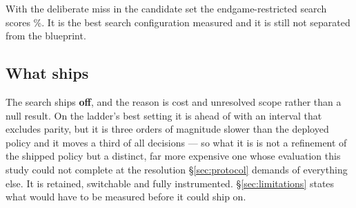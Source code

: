 With the deliberate miss in the candidate set the endgame-restricted search scores
\vsixSearchDead\%. It is the best search configuration measured and it is still not separated from
the blueprint.

\subsection{What ships}
\label{sec:search-ships}

The search ships \textbf{off}, and the reason is cost and unresolved scope rather than a null
result. On the ladder's best setting it is ahead of \vfive{} with an interval that excludes parity,
but it is three orders of magnitude slower than the deployed policy and it moves a third of all
decisions --- so what it is is not a refinement of the
shipped policy but a distinct, far more expensive one whose evaluation this study could not complete
at the resolution \S\ref{sec:protocol} demands of everything else. It is retained, switchable and
fully instrumented. \S\ref{sec:limitations} states what would have to be measured before it could
ship on.
